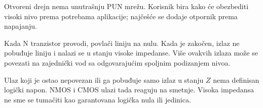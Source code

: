 Otvoreni drejn nema unutrašnju PUN mrežu. Korisnik bira kako će obezbediti visoki nivo prema potrebama aplikacije; najčešće se dodaje otpornik prema napajanju.

Kada N tranzistor provodi, povlači liniju na nulu. Kada je zakočen, izlaz ne pobuđuje liniju i nalazi se u stanju visoke impedanse. Više ovakvih izlaza može se povezati na zajednički vod sa odgovarajućim spoljnim podizanjem nivoa.

Ulaz koji je ostao nepovezan ili ga pobuđuje samo izlaz u stanju $Z$ nema definisan logički napon. NMOS i CMOS ulazi tada reaguju na smetnje. Visoka impedansa ne sme se tumačiti kao garantovana logička nula ili jedinica.
